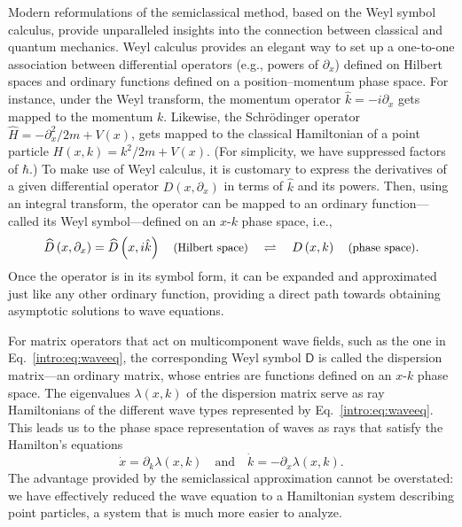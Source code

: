 Modern reformulations of the semiclassical method, based on the Weyl symbol calculus, provide unparalleled insights into the connection between classical and quantum mechanics.
Weyl calculus provides an elegant way to set up a one-to-one association between differential operators (e.g., powers of $\partial_{x}$) defined on Hilbert spaces and ordinary functions defined on a position--momentum phase space.
For instance, under the Weyl transform, the momentum operator $\hat{k} = -i\partial_{x}$ gets mapped to the momentum $k$.
Likewise, the Schr\"{o}dinger operator $\widehat{H} = -\partial_{x}^{2}/2m + V(x)$, gets mapped to the classical Hamiltonian of a point particle $H(x, k) = k^{2}/2m + V(x)$.
(For simplicity, we have suppressed factors of $\hbar$.)
To make use of Weyl calculus, it is customary to express the derivatives of a given differential operator $D(x, \partial_{x})$ in terms of $\hat{k}$ and its powers.
Then, using an integral transform, the operator can be mapped to an ordinary function---called its Weyl symbol---defined on an $x$-$k$ phase space, i.e.,
%
\begin{equation}
  \widehat{D}\left(x, \partial_{x}\right) = \widehat{D}\left(x, i\hat{k}\right) \quad\text{\small(Hilbert space)} \quad\rightleftharpoons{}\quad D\left(x, k\right) \quad\text{\small(phase space)}.
\end{equation}
%
Once the operator is in its symbol form, it can be expanded and approximated just like any other ordinary function, providing a direct path towards obtaining asymptotic solutions to wave equations.

For matrix operators that act on multicomponent wave fields, such as the one in Eq.~\eqref{intro:eq:waveeq}, the corresponding Weyl symbol $\mathsf{D}$ is called the dispersion matrix---an ordinary matrix, whose entries are functions defined on an $x$-$k$ phase space.
The eigenvalues $\lambda(x, k)$ of the dispersion matrix serve as ray Hamiltonians of the different wave types represented by Eq.~\eqref{intro:eq:waveeq}.
This leads us to the phase space representation of waves as rays that satisfy the Hamilton's equations
%
\begin{equation}
\dot{x} = \partial_{k}\lambda(x,k)
\quad\text{and}\quad
\dot{k} = -\partial_{x}\lambda(x, k).
\end{equation}
%
The advantage provided by the semiclassical approximation cannot be overstated: we have effectively reduced the wave equation to a Hamiltonian system describing point particles, a system that is much more easier to analyze.

